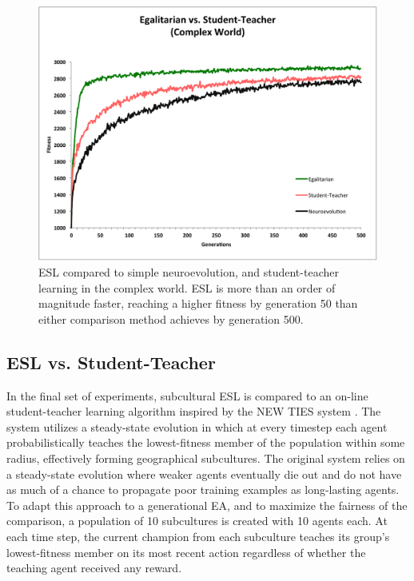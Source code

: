 \documentclass{sig-alternate}
\begin{document}
\begin{figure}[t]
  \centering
    \includegraphics[scale=.41]{egalitarian_vs_student_teacher_complex.pdf}
  \caption{ESL compared to simple neuroevolution, and student-teacher learning in the complex world.  ESL is more than an order of magnitude faster, reaching a higher fitness by generation 50 than either comparison method achieves by generation 500.}
  \label{fig:reward-studentteacher-complex}
\end{figure}

\subsection*{ESL vs. Student-Teacher}
In the final set of experiments, subcultural ESL is compared to an on-line student-teacher learning algorithm inspired by the NEW TIES system \cite{haasdijk2008social}. The system utilizes a steady-state evolution in which at every timestep each agent probabilistically teaches the lowest-fitness member of the population within some radius, effectively forming geographical subcultures. The original system relies on a steady-state evolution where weaker agents eventually die out and do not have as much of a chance to propagate poor training examples as long-lasting agents. To adapt this approach to a generational EA, and to maximize the fairness of the comparison, a population of 10 subcultures is created with 10 agents each. At each time step, the current champion from each subculture teaches its group's lowest-fitness member on its most recent action regardless of whether the teaching agent received any reward.
\end{document}
